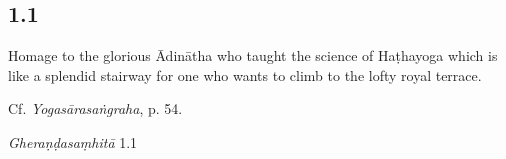 

\pagestyle{HPed}
\begin{ekdosis}


\subsection*{1.1}
\begin{translation}[hp01_001]
Homage to the glorious Ādinātha who taught the science of Haṭhayoga which is like a splendid stairway for one who wants to climb to the lofty royal terrace.%

\end{translation}

\begin{testimonia}[hp01_001]
Cf. \emph{Yogasārasaṅgraha}, p. 54.

\begin{versinnote}
\end{versinnote}

\emph{Gheraṇḍasaṃhitā} 1.1

\begin{versinnote}
\end{versinnote}


\end{testimonia}
\end{ekdosis}
